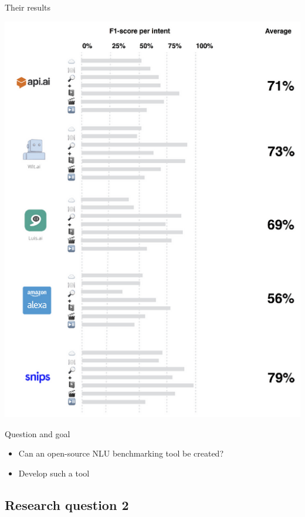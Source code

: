 \documentclass[pdf]{beamer}
\begin{document}
    \begin{frame}{Their results}
        \begin{center}
            \includegraphics[height=0.85\textheight]{figures/snips_own_benchmark.png}
        \end{center}
    \end{frame}

    \begin{frame}{Question and goal}
        \begin{itemize}
            \item Can an open-source NLU benchmarking tool be created?
            \item Develop such a tool
        \end{itemize}
    \end{frame}

    \subsection{Research question 2}
\end{document}
